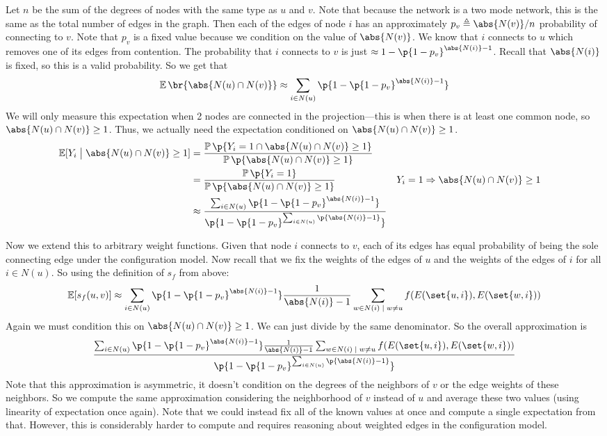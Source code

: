 \documentclass{pset}
\begin{document}
Let $n$ be the sum of the degrees of nodes with the same type as $u$ and $v$.
Note that because the network is a two mode network, this is the same
as the total number of edges in the graph.
Then each of the edges of node $i$
has an approximately $p_v \triangleq \abs{N(v)} / n$ probability of
connecting to $v$. Note that $p_v$ is a fixed value because
we condition on the value of $\abs{N(v)}$.
We know that $i$ connects to $u$ which removes one of its edges from contention.
The probability that $i$ connects to $v$ 
is just $\approx 1 - \p{1 - p_v}^{\abs{N(i)} - 1}$.
Recall that $\abs{N(i)}$ is fixed, so this is a valid probability.
So we get that
\[\Exp\br{\abs{N(u) \cap N(v)}} 
\approx  \sum_{i\in N(u)} \p{1 - \p{1 - p_v}^{\abs{N(i)} - 1}}\]
We will only measure this expectation when 2 nodes are connected in the
projection---this is when there is at least one common
node, so $\abs{N(u) \cap N(v)} \geq 1$. Thus, we actually need the expectation
conditioned on $\abs{N(u) \cap N(v)} \geq 1$.
\begin{align*}
    \Exp[Y_i \;\big|\; \abs{N(u) \cap N(v)} \geq 1]
    &= \frac{\Pr\p{Y_i = 1 \cap \abs{N(u) \cap N(v)} \geq 1}}
    {\Pr\p{\abs{N(u) \cap N(v)} \geq 1}} \\
    &= \frac{\Pr\p{Y_i = 1}}
    {\Pr\p{\abs{N(u) \cap N(v)} \geq 1}} && Y_i = 1 \implies \abs{N(u) \cap N(v)} \geq 1\\
    &\approx \frac{\sum_{i\in N(u)} \p{1 - \p{1 - p_v}^{\abs{N(i)} - 1}}}
    { \p{1 - \p{1 - p_v}^{ \sum_{i\in N(u)} \p{\abs{N(i)} - 1}}}} \\
\end{align*}

Now we extend this to arbitrary weight functions.
Given that node $i$ connects to $v$,
each of its edges has equal probability of being the sole connecting edge
under the configuration model.
Now recall that we fix the weights of the edges of $u$ and the weights
of the edges of $i$ for all $i \in N(u)$.
So using the definition of $s_f$ from above:
\begin{align*}
    \Exp[s_f(u, v)]
    &\approx\sum_{i\in N(u)} \p{1 - \p{1 - p_v}^{\abs{N(i)} - 1}} 
    \frac{1}{\abs{N(i)} - 1}\sum_{w \in N(i) \;|\; w \neq u} f(E(\set{u, i}), E(\set{w, i})) \\
\end{align*}
Again we must condition this on $\abs{N(u) \cap N(v)} \geq 1$.
We can just divide by the same denominator.
So the overall approximation is
\[ \frac{\sum_{i\in N(u)} \p{1 - \p{1 - p_v}^{\abs{N(i)} - 1}} 
    \frac{1}{\abs{N(i)} - 1}\sum_{w \in N(i) \;|\; w \neq u} f(E(\set{u, i}), E(\set{w, i}))}
{ \p{1 - \p{1 - p_v}^{ \sum_{i\in N(u)} \p{\abs{N(i)} - 1}}}} \]
Note that this approximation is asymmetric, it doesn't condition
on the degrees of the neighbors of $v$ or the edge weights of these neighbors.
So we compute the same approximation considering the neighborhood of $v$
instead of $u$ and average these two values (using linearity of expectation
once again). Note that we could instead fix all of the known values at once
and compute a single expectation from that. However, this is considerably
harder to compute and requires reasoning about weighted edges in the
configuration model.
\end{document}
